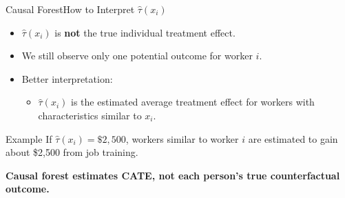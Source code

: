 \documentclass[hyperref={pdfpagelabels=false}]{beamer}
\begin{document}
\begin{frame}{Causal Forest}{How to Interpret $\hat{\tau}(x_i)$}

\begin{itemize}
  \item $\hat{\tau}(x_i)$ is \textbf{not} the true individual treatment effect.
  \vspace{0.2cm}
  \item We still observe only one potential outcome for worker $i$.
  \vspace{0.2cm}
  \item Better interpretation:
  \vspace{0.1cm}
  \begin{itemize}
    \item $\hat{\tau}(x_i)$ is the estimated average treatment effect for workers with characteristics similar to $x_i$.
  \end{itemize}
\end{itemize}

\vspace{0.25cm}
\begin{block}{Example}
If $\hat{\tau}(x_i)=\$2{,}500$, workers similar to worker $i$ are estimated to gain about \$2,500 from job training.
\end{block}

\vspace{0.1cm}
\begin{center}
\textbf{Causal forest estimates CATE, not each person's true counterfactual outcome.}
\end{center}

\end{frame}
\end{document}
